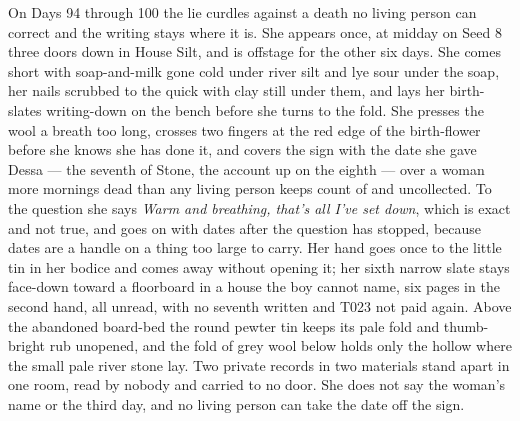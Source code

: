 \documentclass{design/chronicle}
\begin{document}
{On Days 94 through 100 the lie curdles against a death no living person can correct and the writing stays where it is. She appears once, at midday on Seed 8 three doors down in House Silt, and is offstage for the other six days. She comes short with soap-and-milk gone cold under river silt and lye sour under the soap, her nails scrubbed to the quick with clay still under them, and lays her birth-slates writing-down on the bench before she turns to the fold. She presses the wool a breath too long, crosses two fingers at the red edge of the birth-flower before she knows she has done it, and covers the sign with the date she gave Dessa --- the seventh of Stone, the account up on the eighth --- over a woman more mornings dead than any living person keeps count of and uncollected. To the question she says \emph{Warm and breathing, that’s all I’ve set down}, which is exact and not true, and goes on with dates after the question has stopped, because dates are a handle on a thing too large to carry. Her hand goes once to the little tin in her bodice and comes away without opening it; her sixth narrow slate stays face-down toward a floorboard in a house the boy cannot name, six pages in the second hand, all unread, with no seventh written and T023 not paid again. Above the abandoned board-bed the round pewter tin keeps its pale fold and thumb-bright rub unopened, and the fold of grey wool below holds only the hollow where the small pale river stone lay. Two private records in two materials stand apart in one room, read by nobody and carried to no door. She does not say the woman’s name or the third day, and no living person can take the date off the sign.

}
\end{document}
